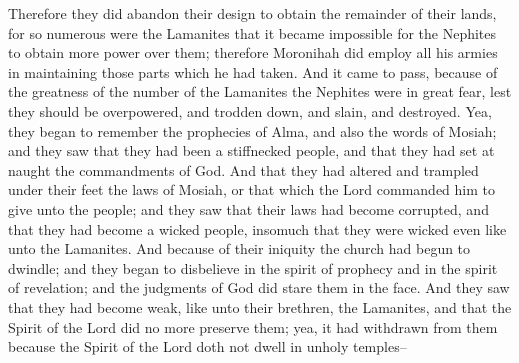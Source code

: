 Therefore they did abandon their design to obtain the remainder of their lands, for so numerous were the Lamanites that it became impossible for the Nephites to obtain more power over them; therefore Moronihah did employ all his armies in maintaining those parts which he had taken.
\bverse \iffalse And it came to pass, because of the greatness of the number of the Lamanites the Nephites were in great fear, lest they should be overpowered, and trodden down, and slain, and destroyed. \fi
And it came to pass, because of the greatness of the number of the Lamanites the Nephites were in great fear, lest they should be overpowered, and trodden down, and slain, and destroyed.
\bverse \iffalse Yea, they began to remember the prophecies of Alma, and also the words of Mosiah; and they saw that they had been a stiffnecked people, and that they had set at naught the commandments of God. \fi
Yea, they began to remember the prophecies of Alma, and also the words of Mosiah; and they saw that they had been a stiffnecked people, and that they had set at naught the commandments of God.
\bverse \iffalse And that they had altered and trampled under their feet the laws of Mosiah, or that which the Lord commanded him to give unto the people; and they saw that their laws had become corrupted, and that they had become a wicked people, insomuch that they were wicked even like unto the Lamanites. \fi
And that they had altered and trampled under their feet the laws of Mosiah, or that which the Lord commanded him to give unto the people; and they saw that their laws had become corrupted, and that they had become a wicked people, insomuch that they were wicked even like unto the Lamanites.
\bverse \iffalse And because of their iniquity the church had begun to dwindle; and they began to disbelieve in the spirit of prophecy and in the spirit of revelation; and the judgments of God did stare them in the face. \fi
And because of their iniquity the church had begun to dwindle; and they began to disbelieve in the spirit of prophecy and in the spirit of revelation; and the judgments of God did stare them in the face.
\bverse \iffalse And they saw that they had become weak, like unto their brethren, the Lamanites, and that the Spirit of the Lord did no more preserve them; yea, it had withdrawn from them because the Spirit of the Lord doth not dwell in unholy temples-- \fi
And they saw that they had become weak, like unto their brethren, the Lamanites, and that the Spirit of the Lord did no more preserve them; yea, it had withdrawn from them because the Spirit of the Lord doth not dwell in unholy temples--
